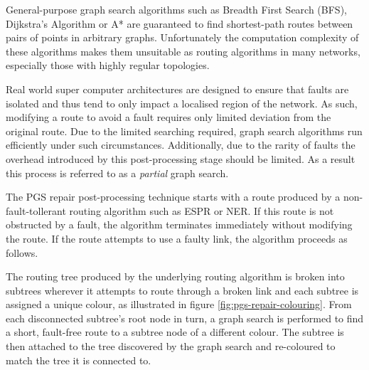 			General-purpose graph search algorithms such as Breadth First Search
			(BFS), Dijkstra's Algorithm or A* are guaranteed to find shortest-path
			routes between pairs of points in arbitrary graphs. Unfortunately the
			computation complexity of these algorithms makes them unsuitable as
			routing algorithms in many networks, especially those with highly regular
			topologies.
			
			Real world super computer architectures are designed to ensure that
			faults are isolated \cite{gara05,alverson12} and thus tend to only impact
			a localised region of the network. As such, modifying a route to avoid a
			fault requires only limited deviation from the original route. Due to the
			limited searching required, graph search algorithms run efficiently under
			such circumstances. Additionally, due to the rarity of faults the
			overhead introduced by this post-processing stage should be limited. As a
			result this process is referred to as a \emph{partial} graph search.
			
			The PGS repair post-processing technique starts with a route produced by
			a non-fault-tollerant routing algorithm such as ESPR or NER. If this
			route is not obstructed by a fault, the algorithm terminates immediately
			without modifying the route. If the route attempts to use a faulty link,
			the algorithm proceeds as follows.
			
			The routing tree produced by the underlying routing algorithm is broken
			into subtrees wherever it attempts to route through a broken link and
			each subtree is assigned a unique colour, as illustrated in figure
			\ref{fig:pgs-repair-colouring}. From each disconnected subtree's root
			node in turn, a graph search is performed to find a short, fault-free
			route to a subtree node of a different colour. The subtree is then
			attached to the tree discovered by the graph search and re-coloured to
			match the tree it is connected to.
			
